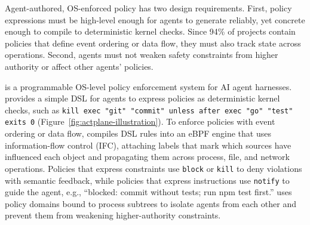 Agent-authored, OS-enforced policy has two design requirements.
First, policy expressions must be high-level enough for agents to generate reliably, yet concrete enough to compile to deterministic kernel checks.
Since 94\% of projects contain policies that define event ordering or data flow, they must also track state across operations.
Second, agents must not weaken safety constraints from higher authority or affect other agents' policies.

\sys{} is a programmable OS-level policy enforcement system for AI agent harnesses.
\sys{} provides a simple DSL for agents to express policies as deterministic kernel checks, such as \texttt{kill exec "git" "commit" unless after exec "go" "test" exits 0} (Figure~\ref{fig:actplane-illustration}).
To enforce policies with event ordering or data flow, \sys{} compiles DSL rules into an eBPF engine that uses information-flow control (IFC), attaching labels that mark which sources have influenced each object and propagating them across process, file, and network operations.
Policies that express constraints use \texttt{block} or \texttt{kill} to deny violations with semantic feedback, while policies that express instructions use \texttt{notify} to guide the agent, e.g., ``blocked: commit without tests; run npm test first.''
\sys{} uses policy domains bound to process subtrees to isolate agents from each other and prevent them from weakening higher-authority constraints.

